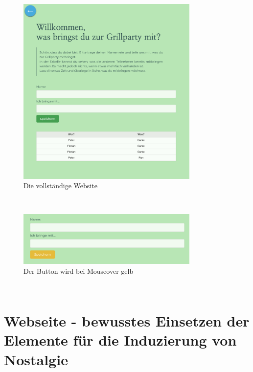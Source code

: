 \documentclass[./dokumentation.tex]{subfiles}
\begin{document}
\begin{figure}[h]
    \centering
    \includegraphics[width=0.8\textwidth]{bilder/website-gelassen.png}
    \caption{Die vollständige Website}
    \label{fig21:website-gelassen}
    \end{figure}\\

\begin{figure}[h]
        \centering
        \includegraphics[width=0.8\textwidth]{bilder/website-gelassen-hover.png}
        \caption{Der Button wird bei Mouseover gelb}
        \label{fig22:website-gelassen-hover}
\end{figure}\\
    

\pagebreak
\section{Webseite - bewusstes Einsetzen der Elemente für die Induzierung von Nostalgie}


\pagebreak
\end{document}
